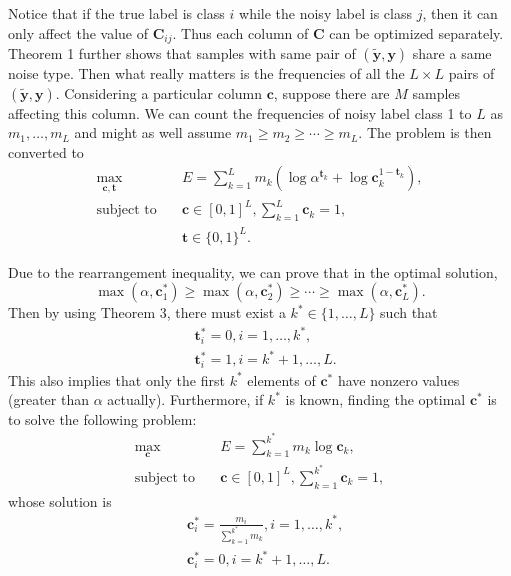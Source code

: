 \documentclass[10pt,twocolumn,letterpaper]{article}
\def\vec{\mathbf}
\def\mat{\mathbf}
\begin{document}
Notice that if the true label is class $i$ while the noisy label is class $j$, then it can only affect the value of $\mat{C}_{ij}$. Thus each column of $\mat{C}$ can be optimized separately. Theorem 1 further shows that samples with same pair of $(\tilde{\vec{y}},\vec{y})$ share a same noise type. Then what really matters is the frequencies of all the $L\times L$ pairs of $(\tilde{\vec{y}},\vec{y})$. Considering a particular column $\vec{c}$, suppose there are $M$ samples affecting this column. We can count the frequencies of noisy label class 1 to $L$ as $m_1,\dots,m_L$ and might as well assume $m_1\geq m_2\geq \cdots \geq m_L$. The problem is then converted to
\begin{equation}
\begin{aligned}
\max_{\vec{c},\vec{t}} \quad & E=\sum_{k=1}^{L} m_k \left(\log \alpha^{\vec{t}_k} + \log \mat{c}_k^{1-\vec{t}_k}\right),\\
\text{subject to} \quad & \vec{c} \in [0,1]^L, \sum_{k=1}^{L} \vec{c}_k = 1,\\
                    & \vec{t} \in \{0,1\}^{L}.
\end{aligned}
\end{equation}

Due to the rearrangement inequality, we can prove that in the optimal solution,
\begin{equation}
    \max(\alpha,\vec{c}^*_1) \geq \max(\alpha,\vec{c}^*_2) \geq \cdots \geq \max(\alpha,\vec{c}^*_L).
\end{equation}
Then by using Theorem 3, there must exist a $k^* \in \{1,\dots,L\}$ such that
\begin{equation} \label{eq:opt_t}
\begin{aligned}
    &\vec{t}^*_i = 0, i = 1,\dots,k^*, \\
    &\vec{t}^*_i = 1, i = k^*+1,\dots,L.
\end{aligned}
\end{equation}
This also implies that only the first $k^*$ elements of $\vec{c}^*$ have nonzero values (greater than $\alpha$ actually). Furthermore, if $k^*$ is known, finding the optimal $\vec{c}^*$ is to solve the following problem:
\begin{equation}
\begin{aligned}
\max_{\vec{c}} \quad & E=\sum_{k=1}^{k^*} m_k \log \mat{c}_k,\\
\text{subject to} \quad & \vec{c} \in [0,1]^L, \sum_{k=1}^{k^*} \vec{c}_k = 1,
\end{aligned}
\end{equation}
whose solution is
\begin{equation} \label{eq:opt_c}
\begin{aligned}
    &\vec{c}^*_i = \frac{m_i}{\sum_{k=1}^{k^*}{m_k}}, i = 1,\dots,k^*,\\
    &\vec{c}^*_i = 0, i = k^*+1,\dots,L.
\end{aligned}
\end{equation}
\end{document}
